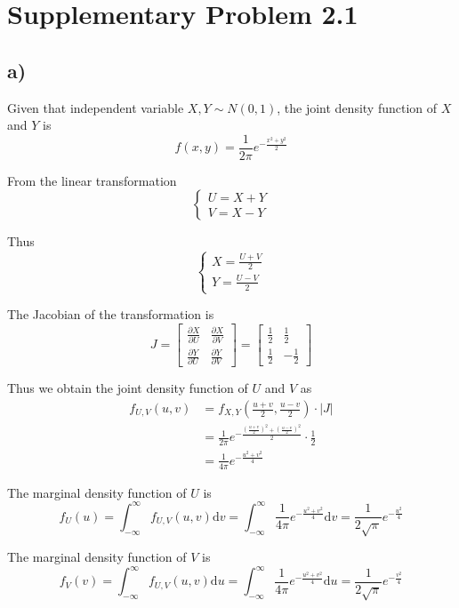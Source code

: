 \documentclass[a4paper, UTF-8]{article}
\theoremstyle{plain}
\begin{document}
\section{Supplementary Problem 2.1} 

\subsection{a)} 

Given that independent variable $X, Y \sim N(0, 1)$, the joint density function of $X$ and $Y$ is
$$
f(x,y) = \frac{1}{2\pi}e^{-\frac{x^2 + y^2}{2}}
$$

From the linear transformation 
$$
\begin{cases} 
U = X + Y\\
V = X - Y
\end{cases}
$$

Thus 
$$
\begin{cases} 
X = \frac{U + V}{2}\\
Y = \frac{U - V}{2}
\end{cases}
$$

The Jacobian of the transformation is
$$
J = \begin{bmatrix} \frac{\partial X}{\partial U} & \frac{\partial X}{\partial V} \\ \frac{\partial Y}{\partial U} & \frac{\partial Y}{\partial V} \end{bmatrix} = \begin{bmatrix} \frac{1}{2} & \frac{1}{2} \\ \frac{1}{2} & -\frac{1}{2} \end{bmatrix}
$$

Thus we obtain the joint density function of $U$ and $V$ as
\begin{align*}
f_{U, V}(u,v) &= f_{X,Y}(\frac{u + v}{2},\frac{u - v}{2}) \cdot |J|\\
&= \frac{1}{2\pi}e^{-\frac{(\frac{u + v}{2})^2 + (\frac{u - v}{2})^2}{2}} \cdot \frac{1}{2}\\
&= \frac{1}{4\pi}e^{-\frac{u^2 + v^2}{4}}
\end{align*}

The marginal density function of $U$ is
$$
f_U(u) = \int_{-\infty}^\infty f_{U, V}(u,v) \mathrm{d}v = \int_{-\infty}^\infty \frac{1}{4\pi}e^{-\frac{u^2 + v^2}{4}} \mathrm{d}v = \frac{1}{2\sqrt{\pi}}e^{-\frac{u^2}{4}}
$$

The marginal density function of $V$ is
$$
f_V(v) = \int_{-\infty}^\infty f_{U, V}(u,v) \mathrm{d}u = \int_{-\infty}^\infty \frac{1}{4\pi}e^{-\frac{u^2 + v^2}{4}} \mathrm{d}u = \frac{1}{2\sqrt{\pi}}e^{-\frac{v^2}{4}}
$$
\end{document}
